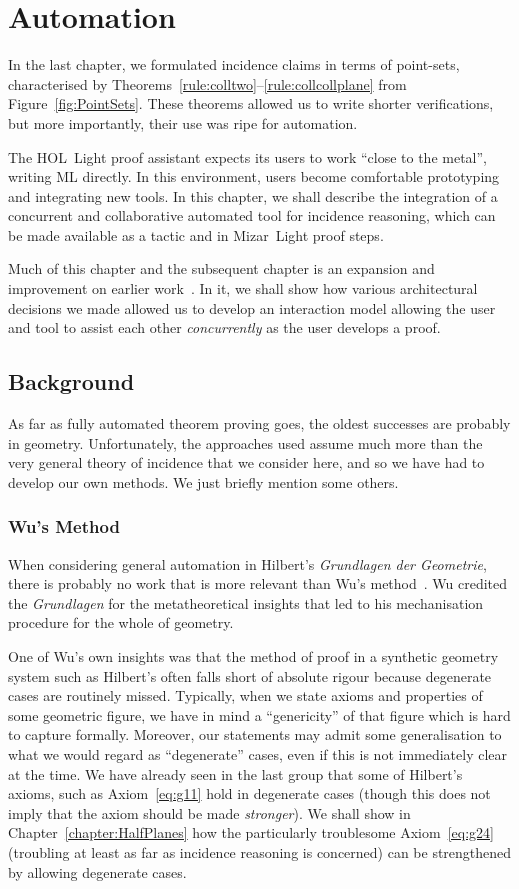 \chapter{Automation}\label{chapter:Automation}
In the last chapter, we formulated incidence claims in terms of point-sets, characterised by Theorems~\ref{rule:colltwo}--\ref{rule:collcollplane} from Figure~\ref{fig:PointSets}. These theorems allowed us to write shorter verifications, but more importantly, their use was ripe for automation. 

The HOL~Light proof assistant expects its users to work ``close to the metal'', writing ML directly. In this environment, users become comfortable prototyping and  integrating new tools. In this chapter, we shall describe the integration of a concurrent and collaborative automated tool for incidence reasoning, which can be made available as a tactic and in Mizar~Light proof steps.

Much of this chapter and the subsequent chapter is an expansion and improvement on earlier work~\cite{ScottExploring,ScottComposable}. In it, we shall show how various architectural decisions we made allowed us to develop an interaction model allowing the user and tool to assist each other \emph{concurrently} as the user develops a proof.

\section{Background}
As far as fully automated theorem proving goes, the oldest successes are probably in geometry. Unfortunately, the approaches used assume much more than the very general theory of incidence that we consider here, and so we have had to develop our own methods. We just briefly mention some others.

\subsection{Wu's Method}
When considering general automation in Hilbert's \emph{Grundlagen der Geometrie}, there is probably no work that is more relevant than Wu's method~\cite{WuMechanicalTheoremProving}. Wu credited the \emph{Grundlagen} for the metatheoretical insights that led to his mechanisation procedure for the whole of geometry.

One of Wu's own insights was that the method of proof in a synthetic geometry system such as Hilbert's often falls short of absolute rigour because degenerate cases are routinely missed. Typically, when we state axioms and properties of some geometric figure, we have in mind a ``genericity'' of that figure which is hard to capture formally. Moreover, our statements may admit some generalisation to what we would regard as ``degenerate'' cases, even if this is not immediately clear at the time. We have already seen in the last group that some of Hilbert's axioms, such as Axiom~\ref{eq:g11} hold in degenerate cases (though this does not imply that the axiom should be made \emph{stronger}). We shall show in Chapter~\ref{chapter:HalfPlanes} how the particularly troublesome Axiom~\ref{eq:g24} (troubling at least as far as incidence reasoning is concerned) can be strengthened by allowing degenerate cases.

